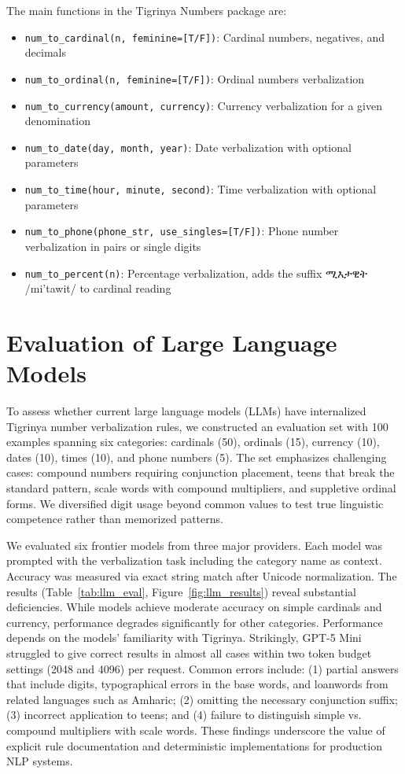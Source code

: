 \documentclass{article}
\newcommand{\tiipa}[2]{{\geezfont #1} /#2/}
\begin{document}
\vspace{1cm}

The main functions in the Tigrinya Numbers package are:

\begin{itemize}[noitemsep, topsep=0pt]
 \item \texttt{num\_to\_cardinal(n, feminine=[T/F])}: Cardinal numbers, negatives, and decimals
 \item \texttt{num\_to\_ordinal(n, feminine=[T/F])}: Ordinal numbers verbalization
 \item \texttt{num\_to\_currency(amount, currency)}: Currency verbalization for a given denomination
 \item \texttt{num\_to\_date(day, month, year)}: Date verbalization with optional parameters
 \item \texttt{num\_to\_time(hour, minute, second)}: Time verbalization with optional parameters
 \item \texttt{num\_to\_phone(phone\_str, use\_singles=[T/F])}: Phone number verbalization in pairs or single digits
 \item \texttt{num\_to\_percent(n)}: Percentage verbalization, adds the suffix \tiipa{ሚእታዊት}{mi'tawit} to cardinal reading
\end{itemize}

\section{Evaluation of Large Language Models}

To assess whether current large language models (LLMs) have internalized Tigrinya number verbalization rules, we constructed an evaluation set with 100 examples spanning six categories: cardinals (50), ordinals (15), currency (10), dates (10), times (10), and phone numbers (5). The set emphasizes challenging cases: compound numbers requiring conjunction placement, teens that break the standard pattern, scale words with compound multipliers, and suppletive ordinal forms. We diversified digit usage beyond common values to test true linguistic competence rather than memorized patterns.

We evaluated six frontier models from three major providers. Each model was prompted with the verbalization task including the category name as context. Accuracy was measured via exact string match after Unicode normalization. The results (Table~\ref{tab:llm_eval}, Figure~\ref{fig:llm_results}) reveal substantial deficiencies. While models achieve moderate accuracy on simple cardinals and currency, performance degrades significantly for other categories. Performance depends on the models' familiarity with Tigrinya. Strikingly, GPT-5 Mini struggled to give correct results in almost all cases within two token budget settings (2048 and 4096) per request. Common errors include: (1) partial answers that include digits, typographical errors in the base words, and loanwords from related languages such as Amharic; (2) omitting the necessary conjunction suffix; (3) incorrect application to teens; and (4) failure to distinguish simple vs. compound multipliers with scale words. These findings underscore the value of explicit rule documentation and deterministic implementations for production NLP systems.
\end{document}

